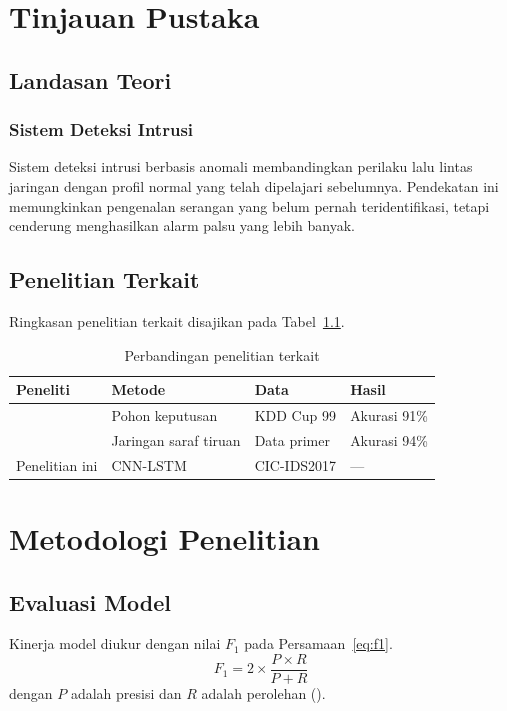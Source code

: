 \documentclass{mti-unla}       %
\begin{document}
\chapter{Tinjauan Pustaka}\label{bab:tinjauan}
\section{Landasan Teori}
\subsection{Sistem Deteksi Intrusi}
Sistem deteksi intrusi berbasis anomali membandingkan perilaku lalu lintas jaringan dengan profil normal yang telah dipelajari sebelumnya. Pendekatan ini memungkinkan pengenalan serangan yang belum pernah teridentifikasi, tetapi cenderung menghasilkan alarm palsu yang lebih banyak.

\section{Penelitian Terkait}
Ringkasan penelitian terkait disajikan pada Tabel~\ref{tab:sota}.
\begin{table}[htbp]
  \caption{Perbandingan penelitian terkait}\label{tab:sota}
  \centering
  \begin{tabular}{@{}p{3.6cm}p{3.4cm}p{3cm}p{2.6cm}@{}}
    \toprule
    \textbf{Peneliti} & \textbf{Metode} & \textbf{Data} & \textbf{Hasil}\\ \midrule
    \textcite{gao2009} & Pohon keputusan & KDD Cup 99 & Akurasi 91\%\\
    \textcite{kramer2005} & Jaringan saraf tiruan & Data primer & Akurasi 94\%\\
    Penelitian ini & CNN-LSTM & CIC-IDS2017 & ---\\ \bottomrule
  \end{tabular}
\end{table}

\chapter{Metodologi Penelitian}
\section{Evaluasi Model}
Kinerja model diukur dengan nilai $F_1$ pada Persamaan~\eqref{eq:f1}.
\begin{equation}
  F_1 = 2 \times \frac{P \times R}{P + R}
  \label{eq:f1}
\end{equation}
dengan $P$ adalah presisi dan $R$ adalah perolehan ().
\end{document}
